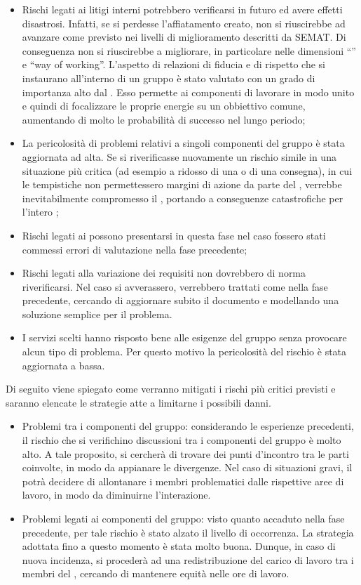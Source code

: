 \FloatBarrier
\begin{itemize}
\item Rischi legati ai litigi interni potrebbero verificarsi in futuro ed avere effetti disastrosi. Infatti, se si perdesse l'affiatamento creato, non si riuscirebbe ad avanzare come previsto nei livelli di miglioramento descritti da SEMAT. Di conseguenza non si riuscirebbe a migliorare, in particolare nelle dimensioni ``'' e ``way of working''. L'aspetto di relazioni di fiducia e di rispetto che si instaurano all'interno di un gruppo è stato valutato con un grado di importanza alto dal \rRP. Esso permette ai componenti di lavorare  in modo unito e quindi di focalizzare le proprie energie su un obbiettivo comune, aumentando di molto le probabilità di successo nel lungo periodo;
\item La pericolosità di problemi relativi a singoli componenti del gruppo è stata aggiornata ad alta. Se si riverificasse nuovamente un rischio simile in una situazione più critica (ad esempio a ridosso di una  o di una consegna), in cui le tempistiche non permettessero margini di azione da parte del \rRP, verrebbe inevitabilmente compromesso il , portando a conseguenze catastrofiche per l'intero ;
\item Rischi legati ai  possono presentarsi in questa fase nel caso fossero stati commessi errori di valutazione nella fase precedente;
\item Rischi legati alla variazione dei requisiti non dovrebbero di norma riverificarsi. Nel caso si avverassero, verrebbero trattati come nella fase precedente, cercando di aggiornare subito il documento e modellando una soluzione semplice per il problema.
\item I servizi  scelti hanno risposto bene alle esigenze del gruppo senza provocare alcun tipo di problema. Per questo motivo la pericolosità del rischio è stata aggiornata a bassa.
\end{itemize}
\label{mRisk4}
Di seguito viene spiegato come verranno mitigati i rischi più critici previsti e saranno elencate le strategie atte a limitarne i possibili danni.
\begin{itemize}
\item{Problemi tra i componenti del gruppo:} considerando le esperienze precedenti, il rischio che si verifichino discussioni tra i componenti del gruppo è molto alto. A tale proposito, si cercherà di trovare dei punti d'incontro tra le parti coinvolte, in modo da appianare le divergenze. Nel caso di situazioni gravi, il \rRP potrà decidere di allontanare i membri problematici dalle rispettive aree di lavoro, in modo da diminuirne l'interazione.
\item{Problemi legati ai componenti del gruppo:} visto quanto accaduto nella fase precedente, per tale rischio è stato alzato il livello di occorrenza. La strategia adottata fino a questo momento è stata molto buona. Dunque, in caso di nuova incidenza, si procederà ad una redistribuzione del carico di lavoro tra i membri del , cercando di mantenere equità nelle ore di lavoro.
\end{itemize}
